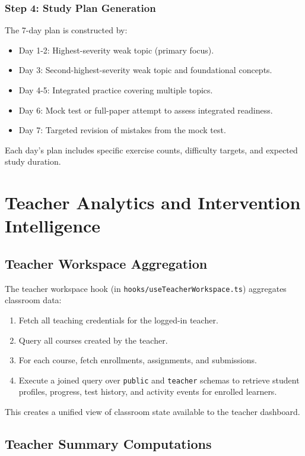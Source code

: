 \documentclass[sigconf,authordraft,twoside]{acmart}
\newcommand{\tech}[1]{\textcolor{brandblue}{\nolinkurl{#1}}}
\begin{document}
\subsubsection{Step 4: Study Plan Generation}
The 7-day plan is constructed by:
\begin{itemize}
\item Day 1-2: Highest-severity weak topic (primary focus).
\item Day 3: Second-highest-severity weak topic and foundational concepts.
\item Day 4-5: Integrated practice covering multiple topics.
\item Day 6: Mock test or full-paper attempt to assess integrated readiness.
\item Day 7: Targeted revision of mistakes from the mock test.
\end{itemize}

Each day's plan includes specific exercise counts, difficulty targets, and expected study duration.

\section{Teacher Analytics and Intervention Intelligence} \label{sec:teacher-analytics}

\subsection{Teacher Workspace Aggregation}

The teacher workspace hook (in \tech{hooks/useTeacherWorkspace.ts}) aggregates classroom data:

\begin{enumerate}
\item Fetch all teaching credentials for the logged-in teacher.
\item Query all courses created by the teacher.
\item For each course, fetch enrollments, assignments, and submissions.
\item Execute a joined query over \tech{public} and \tech{teacher} schemas to retrieve student profiles, progress, test history, and activity events for enrolled learners.
\end{enumerate}

This creates a unified view of classroom state available to the teacher dashboard.

\subsection{Teacher Summary Computations}
\end{document}

